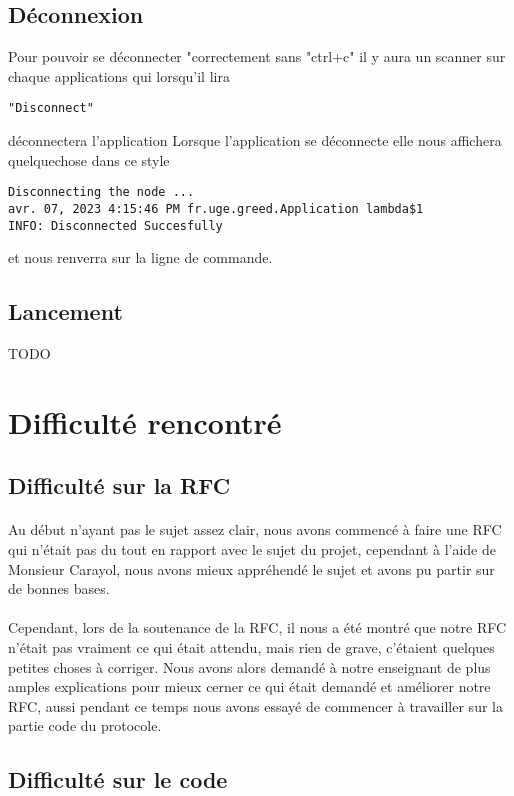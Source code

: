 \documentclass[a4paper,titlepage]{report}
\begin{document}
\subsection{Déconnexion}
Pour pouvoir se déconnecter "correctement sans "ctrl+c" il y aura un scanner sur chaque applications qui lorsqu'il lira 
\begin{lstlisting}
"Disconnect" 
\end{lstlisting}
déconnectera l'application 
Lorsque l'application se déconnecte elle nous affichera quelquechose dans ce style
\begin{lstlisting}
Disconnecting the node ...
avr. 07, 2023 4:15:46 PM fr.uge.greed.Application lambda$1
INFO: Disconnected Succesfully
\end{lstlisting}
et nous renverra sur la ligne de commande.
\subsection{Lancement}
TODO
\section{Difficulté rencontré}
\subsection{Difficulté sur la RFC}
\paragraph{}
Au début n'ayant pas le sujet assez clair, nous avons commencé à faire une RFC qui n'était pas du tout en rapport avec le sujet du projet, cependant à l'aide de Monsieur Carayol, nous avons mieux appréhendé le sujet et avons pu partir sur de bonnes bases.
\paragraph{}
Cependant, lors de la soutenance de la RFC, il nous a été montré que notre RFC n'était pas vraiment ce qui était attendu, mais rien de grave, c'étaient quelques petites choses à corriger.
Nous avons alors demandé à notre enseignant de plus amples explications pour mieux cerner ce qui était demandé et améliorer notre RFC, aussi pendant ce temps nous avons essayé de commencer à travailler sur la partie code du protocole.
\subsection{Difficulté sur le code}
\end{document}
